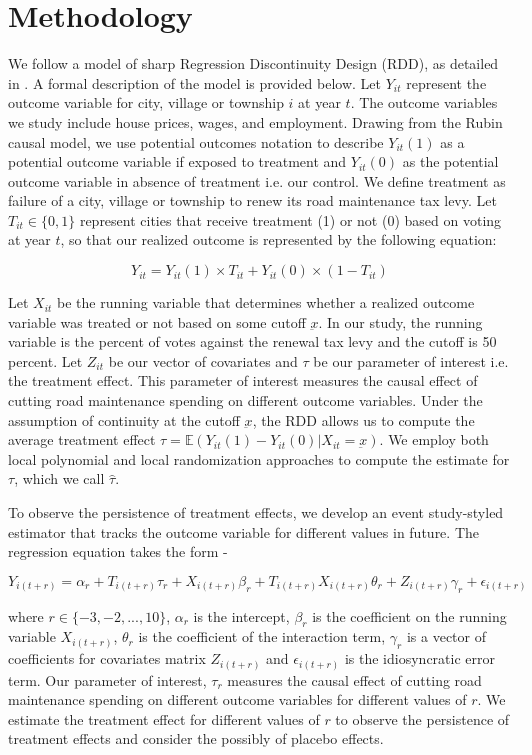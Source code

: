 \section{Methodology} \label{sec:method}

We follow a model of sharp Regression Discontinuity Design (RDD), as detailed in \cite{calonico2019regression}. A formal description of the model is provided below. Let $Y_{it}$ represent the outcome variable for city, village or township $i$ at year $t$. The outcome variables we study include house prices, wages, and employment. Drawing from the Rubin causal model, we use potential outcomes notation to describe $Y_{it}(1)$ as a potential outcome variable if exposed to treatment and $Y_{it}(0)$ as the potential outcome variable in absence of treatment i.e. our control. We define treatment as failure of a city, village or township to renew its road maintenance tax levy. Let $T_{it} \in \{0,1\}$ represent cities that receive treatment (1) or not (0) based on voting at year $t$, so that our realized outcome is represented by the following equation:

$$
Y_{it} = Y_{it}(1) \times T_{it} + Y_{it}(0) \times (1-T_{it})
$$

Let $X_{it}$ be the running variable that determines whether a realized outcome variable was treated or not based on some cutoff $\underbar{x}$. In our study, the running variable is the percent of votes against the renewal tax levy and the cutoff is 50 percent. Let $Z_{it}$ be our vector of covariates and $\tau$ be our parameter of interest i.e. the treatment effect. This parameter of interest measures the causal effect of cutting road maintenance spending on different outcome variables. Under the assumption of continuity at the cutoff $\underbar{x}$, the RDD allows us to compute the average treatment effect $\tau = \mathbb{E}(Y_{it}(1) - Y_{it}(0) | X_{it} = \underbar{x})$. We employ both local polynomial and local randomization approaches to compute the estimate for $\tau$, which we call $\hat{\tau}$.

To observe the persistence of treatment effects, we develop an event study-styled estimator that tracks the outcome variable for different values in future. The regression equation takes the form -

$$
Y_{i(t+r)} = \alpha_r + T_{i(t+r)} \tau_r + X_{i(t+r)} \beta_r + T_{i(t+r)} X_{i(t+r)} \theta_r + Z_{i(t+r)} \gamma_r + \epsilon_{i(t+r)}
$$

\noindent where $r \in \{-3,-2, ..., 10 \}$, $\alpha_r$ is the intercept, $\beta_r$ is the coefficient on the running variable $X_{i(t+r)}$, $\theta_r$ is the coefficient of the interaction term, $\gamma_r$ is a vector of coefficients for covariates matrix $Z_{i(t+r)}$ and $\epsilon_{i(t+r)}$ is the idiosyncratic error term. Our parameter of interest, $\tau_r$ measures the causal effect of cutting road maintenance spending on different outcome variables for different values of $r$. We estimate the treatment effect for different values of $r$ to observe the persistence of treatment effects and consider the possibly of placebo effects. 

